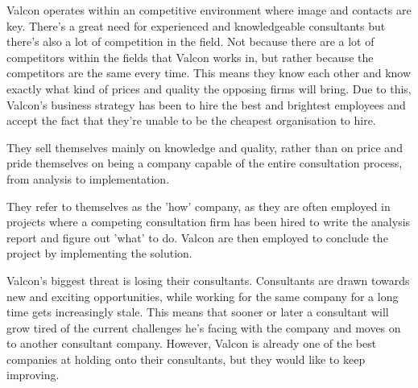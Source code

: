 Valcon operates within an competitive environment where image and contacts are key. 
There's a great need for experienced and knowledgeable consultants but there's also a lot of competition in the field.
Not because there are a lot of competitors within the fields that Valcon works in, but rather because the competitors are the same every time.
This means they know each other and know exactly what kind of prices and quality the opposing firms will bring.
Due to this, Valcon's business strategy has been to hire the best and brightest employees and accept the fact that they're unable to be the cheapest organisation to hire.

They sell themselves mainly on knowledge and quality, rather than on price and pride themselves on being a company capable of the entire consultation process, from analysis to implementation.

They refer to themselves as the 'how' company, as they are often employed in projects where a competing consultation firm has been hired to write the analysis report and figure out 'what' to do. 
Valcon are then employed to conclude the project by implementing the solution.

Valcon's biggest threat is losing their consultants.
Consultants are drawn towards new and exciting opportunities, while working for the same company for a long time gets increasingly stale.
This means that sooner or later a consultant will grow tired of the current challenges he's facing with the company and moves on to another consultant company.
However, Valcon is already one of the best companies at holding onto their consultants, but they would like to keep improving. 